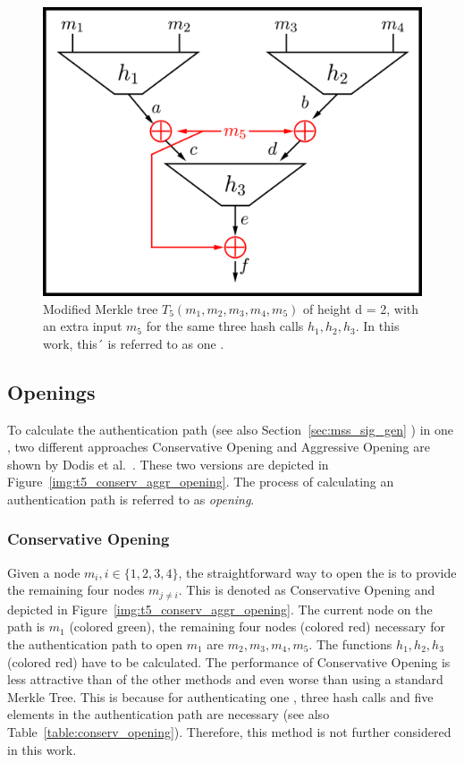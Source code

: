 \begin{figure}
\centering
\includegraphics[]{images/Methods/abcd_paperT5_block_depiction.png}
\caption{Modified Merkle tree $T_5(m_1, m_2, m_3, m_4, m_5)$ of height d = 2,   with an extra input $m_5$ for the same three hash calls $h_1, h_2, h_3$. In this work, this´ is referred to as one \tfblock.~\cite{T5_paper}}
\label{img:t5_paper_block_depiction}
\end{figure}

\subsection{\texorpdfstring{\tf}{T5} Openings}
To calculate the authentication path (see also Section~\ref{sec:mss_sig_gen} ) in one \tfblock, two different approaches Conservative Opening and Aggressive Opening are shown by Dodis et al.~\cite{T5_paper}. These two versions are depicted in Figure~\ref{img:t5_conserv_aggr_opening}.
The process of calculating an authentication path is referred to as \textit{opening}. 

\subsubsection{Conservative Opening}
\label{sec:conserv_opening}
Given a node $m_i, i \in \{1,2,3,4\}$, the straightforward way to open the \tfblock is to provide the remaining four nodes $m_{j \neq i}$. This is denoted as Conservative Opening and depicted in Figure~\ref{img:t5_conserv_aggr_opening}. The current node on the path is $m_1$ (colored green), the remaining four nodes (colored red) necessary for the authentication path to open $m_1$ are $m_2, m_3, m_4, m_5$. The functions $h_1, h_2, h_3$ (colored red) have to be calculated. The performance of Conservative Opening is less attractive than of the other methods and even worse than using a standard Merkle Tree. This is because for authenticating one \tfblock, three hash calls and five elements in the authentication path are necessary (see also Table~\ref{table:conserv_opening}). Therefore, this method is not further considered in this work. 

